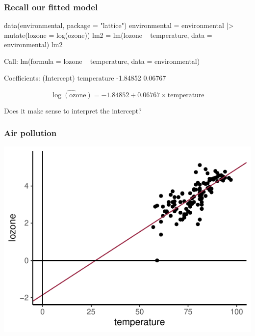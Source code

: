 \documentclass[a4paper]{article}
\begin{document}
\subsubsection{Recall our fitted model}
\begin{Schunk}
\begin{Sinput}
data(environmental, package = "lattice")
environmental = environmental |> 
  mutate(lozone = log(ozone))
lm2 = lm(lozone ~ temperature, data = environmental)
lm2
\end{Sinput}
\begin{Soutput}

Call:
lm(formula = lozone ~ temperature, data = environmental)

Coefficients:
(Intercept)  temperature  
   -1.84852      0.06767  
\end{Soutput}
\end{Schunk}
\[
	\widehat{\log(\text{ozone})} = -1.84852 + 0.06767\times\text{temperature}
\]
\begin{tcolorbox}[greenstylecolor, title = How do we interpret this model?]
	Does it make sense to interpret the intercept?
\end{tcolorbox}
\subsubsection{Air pollution}
\begin{Schunk}


{\centering \includegraphics[width=\maxwidth]{figure/listings-unnamed-chunk-355-1} 

}

\end{Schunk}
\end{document}
